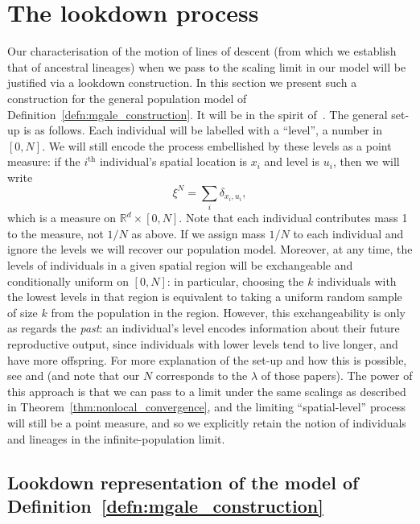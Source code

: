 \documentclass[12pt]{article}
\newcommand{\IR}{\mathbb R}
\newcommand{\lp}{\xi}              %
\numberwithin{equation}{section}
\begin{document}
\section{The lookdown process}
    \label{sec:lookdown}

Our characterisation of the motion of lines of descent (from which we establish
that of ancestral lineages) when we pass
to the scaling limit in our model will be justified via a lookdown construction.
In this section 
we present such a construction for the general population model 
of Definition~\ref{defn:mgale_construction}. It will be
in the spirit of~\cite{kurtz/rodrigues:2011}. 
The general set-up is as follows.
Each individual will be labelled with a ``level'', a number in $[0, N]$.
We will still encode the process embellished by these levels
as a point measure:
if the $i^\mathrm{th}$ individual's spatial location is $x_i$
and level is $u_i$, then we will write
\[
    \lp^N = \sum_i \delta_{x_i, u_i} ,
\]
which is a measure on $\IR^d \times [0, N]$.
Note that each individual contributes mass 1 to the measure,
not $1/N$ as above. If we assign mass $1/N$ to each individual and 
ignore the levels we will recover our population model. 
Moreover, at any time, the levels of 
individuals in a given spatial region 
will be exchangeable and conditionally uniform on $[0, N]$:
in particular, choosing the $k$ individuals with the lowest levels 
in that region
is equivalent to taking a uniform random sample of size $k$ 
from the population in the region.
However, this exchangeability is only as regards the \emph{past}:
an individual's level encodes information about their future reproductive output,
since individuals with lower levels tend to live longer, and have more offspring.
For more explanation of the set-up and how this is possible,
see \citet{kurtz/rodrigues:2011} and \citet{etheridge/kurtz:2019} 
(and note that our $N$ corresponds to the $\lambda$ of those papers).
The power of this approach is that we can pass to a limit under the
same scalings as described in Theorem~\ref{thm:nonlocal_convergence}, 
and 
the limiting ``spatial-level'' process will still be a point measure,
and so we explicitly retain the notion of individuals and lineages
in the infinite-population limit.


\subsection{Lookdown representation of the model of 
Definition~\ref{defn:mgale_construction}}
\label{sec:lookdown_defn}
\end{document}
